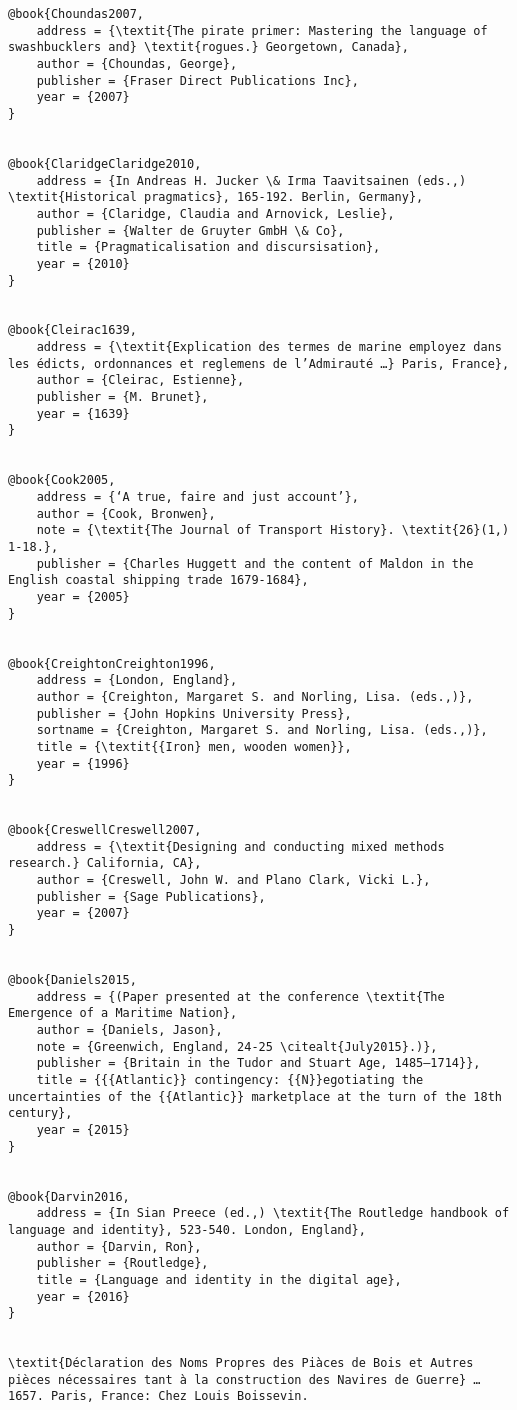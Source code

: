 \begin{verbatim}
@book{Choundas2007,
	address = {\textit{The pirate primer: Mastering the language of swashbucklers and} \textit{rogues.} Georgetown, Canada},
	author = {Choundas, George},
	publisher = {Fraser Direct Publications Inc},
	year = {2007}
}


@book{ClaridgeClaridge2010,
	address = {In Andreas H. Jucker \& Irma Taavitsainen (eds.,) \textit{Historical pragmatics}, 165-192. Berlin, Germany},
	author = {Claridge, Claudia and Arnovick, Leslie},
	publisher = {Walter de Gruyter GmbH \& Co},
	title = {Pragmaticalisation and discursisation},
	year = {2010}
}


@book{Cleirac1639,
	address = {\textit{Explication des termes de marine employez dans les édicts, ordonnances et reglemens de l’Admirauté …} Paris, France},
	author = {Cleirac, Estienne},
	publisher = {M. Brunet},
	year = {1639}
}


@book{Cook2005,
	address = {‘A true, faire and just account’},
	author = {Cook, Bronwen},
	note = {\textit{The Journal of Transport History}. \textit{26}(1,) 1-18.},
	publisher = {Charles Huggett and the content of Maldon in the English coastal shipping trade 1679-1684},
	year = {2005}
}


@book{CreightonCreighton1996,
	address = {London, England},
	author = {Creighton, Margaret S. and Norling, Lisa. (eds.,)},
	publisher = {John Hopkins University Press},
	sortname = {Creighton, Margaret S. and Norling, Lisa. (eds.,)},
	title = {\textit{{Iron} men, wooden women}},
	year = {1996}
}


@book{CreswellCreswell2007,
	address = {\textit{Designing and conducting mixed methods research.} California, CA},
	author = {Creswell, John W. and Plano Clark, Vicki L.},
	publisher = {Sage Publications},
	year = {2007}
}


@book{Daniels2015,
	address = {(Paper presented at the conference \textit{The Emergence of a Maritime Nation},
	author = {Daniels, Jason},
	note = {Greenwich, England, 24-25 \citealt{July2015}.)},
	publisher = {Britain in the Tudor and Stuart Age, 1485–1714}},
	title = {{{Atlantic}} contingency: {{N}}egotiating the uncertainties of the {{Atlantic}} marketplace at the turn of the 18th century},
	year = {2015}
}


@book{Darvin2016,
	address = {In Sian Preece (ed.,) \textit{The Routledge handbook of language and identity}, 523-540. London, England},
	author = {Darvin, Ron},
	publisher = {Routledge},
	title = {Language and identity in the digital age},
	year = {2016}
}


\textit{Déclaration des Noms Propres des Piàces de Bois et Autres pièces nécessaires tant à la construction des Navires de Guerre} …1657. Paris, France: Chez Louis Boissevin.


\end{verbatim}

